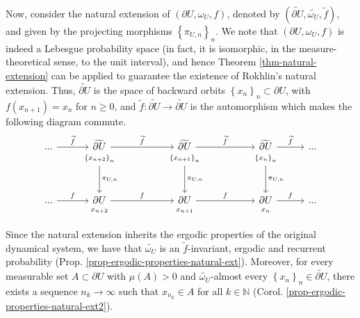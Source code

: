 \documentclass[11pt]{article}
\theoremstyle{definition}
\theoremstyle{remark}
\theoremstyle{plain}
\begin{document}
Now, consider the  natural extension of $ (\partial U,  \omega_U, f) $, denoted by $ (\widetilde{\partial U},  \widetilde{\omega_U}, \widetilde{f}) $, and given by the projecting morphisms $ \left\lbrace \pi_{U,n}\right\rbrace _n $. We note that $ (\partial U,  \omega_U, f) $ is indeed a Lebesgue probability space (in fact, it is isomorphic, in the measure-theoretical sense, to the unit interval), and hence Theorem \ref{thm-natural-extension} can be applied to guarantee the existence of Rokhlin's natural extension. Thus, $ \widetilde{\partial U} $ is the space of backward orbits $ \left\lbrace x_n\right\rbrace _n\subset \partial U $, with $ f(x_{n+1})=x_n $ for $ n\geq 0 $, and $ \widetilde{f}\colon  \widetilde{\partial U}\to \widetilde{\partial U}$ is the automorphism which makes  the following diagram commute.
\[\begin{tikzcd}[row sep=-0.2em,/tikz/row 3/.style={row sep=4em}]
...\arrow{r}{\widetilde{f}} &	\widetilde{\partial U} \arrow{rr}{\widetilde{f}} & &	\widetilde{\partial U} \arrow{rr}{\widetilde{f}} & &	\widetilde{\partial U}\arrow{r}{\widetilde{f}} &...\\ 
&	{\scriptstyle \left\lbrace x_{n+2}\right\rbrace _n} \arrow{ddddddd}{\pi_{U,n}}& &{\scriptstyle \left\lbrace x_{n+1}\right\rbrace _n} \arrow{ddddddd}{\pi_{U,n}}& &	{\scriptstyle \left\lbrace x_{n}\right\rbrace _n }\arrow{ddddddd}{\pi_{U,n}} \\ \\ \\	\\ \\ \\ \\...\arrow{r}{f} &\partial U \arrow{rr}{f}  &&
\partial U \arrow{rr}{f}  && \partial U \arrow{r}{f} &...\\ &{\scriptstyle x_{n+2} }&&{\scriptstyle x_{n+1} }&&{\scriptstyle x_n}
\end{tikzcd}
\]

Since the natural extension inherits the ergodic properties of the original dynamical system, we have that $ \widetilde{\omega_U} $ is an $ \widetilde{f }$-invariant, ergodic and recurrent probability (Prop. \ref{prop-ergodic-properties-natural-ext}). Moreover, for every measurable set $ A\subset \partial U $ with $ \mu(A)>0 $ and $ \widetilde{\omega_U} $-almost every $ \left\lbrace x_n\right\rbrace _n\in \widetilde{\partial U}$, there exists a sequence $ n_k\to \infty $ such that $ x_{n_k}\in A $ for all $k\in\mathbb{N}$ (Corol. \ref{prop-ergodic-properties-natural-ext2}). 
\end{document}
